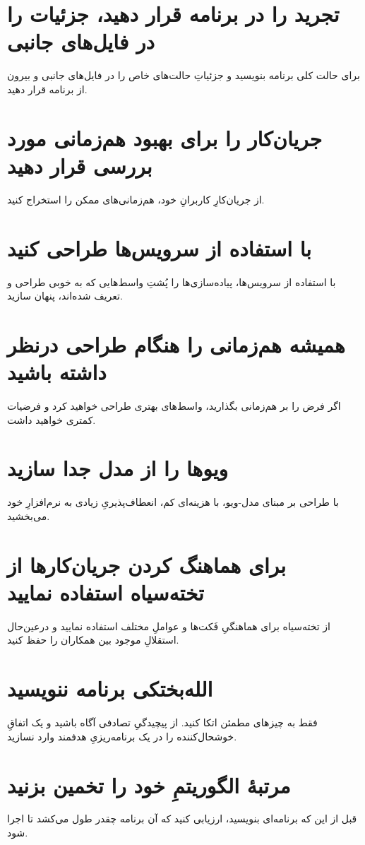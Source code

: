 \documentclass[10pt, a4paper]{book}
\begin{document}
    \section{تجرید را در برنامه قرار دهید، جزئیات را در فایل‌های جانبی}
    برای حالت کلی برنامه بنویسید و جزئیاتِ حالت‌های خاص را در فایل‌های جانبی و بیرون از برنامه قرار دهید.

    \section{جریان‌کار را برای بهبود هم‌زمانی مورد بررسی قرار دهید}
    از جریان‌کارِ کاربرانِ خود، هم‌زمانی‌های ممکن را استخراج کنید.

    \section{با استفاده از سرویس‌ها طراحی کنید}
    با استفاده از سرویس‌ها، پیاده‌سازی‌ها را پُشتِ واسط‌هایی که به خوبی طراحی و تعریف شده‌اند، پنهان سازید.

    \section{همیشه هم‌زمانی را هنگام طراحی درنظر داشته باشید}
    اگر فرض را بر هم‌زمانی بگذارید، واسط‌های بهتری طراحی خواهید کرد و فرضیات کمتری خواهید داشت.

    \section{ویو‌ها را از مدل جدا سازید}
    با طراحی بر مبنای مدل-ویو، با هزینه‌ای کم، انعطاف‌پذیریِ زیادی به نرم‌افزارِ خود می‌بخشید.

    \section{برای هماهنگ کردن جریان‌کارها از تخته‌سیاه استفاده نمایید}
    از تخته‌سیاه برای هماهنگیِ فَکت‌ها و عواملِ مختلف استفاده نمایید و درعین‌حال استقلالِ موجود بین همکاران را حفظ کنید.

    \section{الله‌بختکی برنامه ننویسید}
    فقط به چیزهای مطمئن اتکا کنید. از پیچیدگیِ تصادفی آگاه باشید و یک اتفاقِ خوشحال‌کننده را در یک برنامه‌ریزیِ هدفمند وارد نسازید.

    \section{مرتبهٔ الگوریتمِ خود را تخمین بزنید}
    قبل از این که برنامه‌ای بنویسید، ارزیابی کنید که آن برنامه چقدر طول می‌کشد تا اجرا شود.
\end{document}
